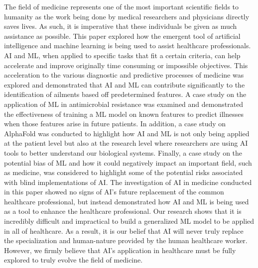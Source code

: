 \documentclass[a4paper]{article}
\begin{document}
The field of medicine represents one of the most important scientific fields to humanity as the work being done by medical researchers and physicians directly saves lives. As such, it is imperative that these individuals be given as much assistance as possible. This paper explored how the emergent tool of artificial intelligence and machine learning is being used to assist healthcare professionals. AI and ML, when applied to specific tasks that fit a certain criteria, can help accelerate and improve originally time consuming or impossible objectives. This acceleration to the various diagnostic and predictive processes of medicine was explored and demonstrated that AI and ML can contribute significantly to the identification of ailments based off predetermined features. A case study on the application of ML in antimicrobial resistance was examined and demonstrated the effectiveness of training a ML model on known features to predict illnesses when those features arise in future patients. In addition, a case study on AlphaFold was conducted to highlight how AI and ML is not only being applied at the patient level but also at the research level where researchers are using AI tools to better understand our biological systems. Finally, a case study on the potential bias of ML and how it could negatively impact an important field, such as medicine, was considered to highlight some of the potential risks associated with blind implementations of AI. The investigation of AI in medicine conducted in this paper showed no signs of AI's future replacement of the common healthcare professional, but instead demonstrated how AI and ML is being used as a tool to enhance the healthcare professional. Our research shows that it is incredibly difficult and impractical to build a generalized ML model to be applied in all of healthcare. As a result, it is our belief that AI will never truly replace the specialization and human-nature provided by the human healthcare worker. However, we firmly believe that AI's application in healthcare must be fully explored to truly evolve the field of medicine.  

\newpage



\end{document}
